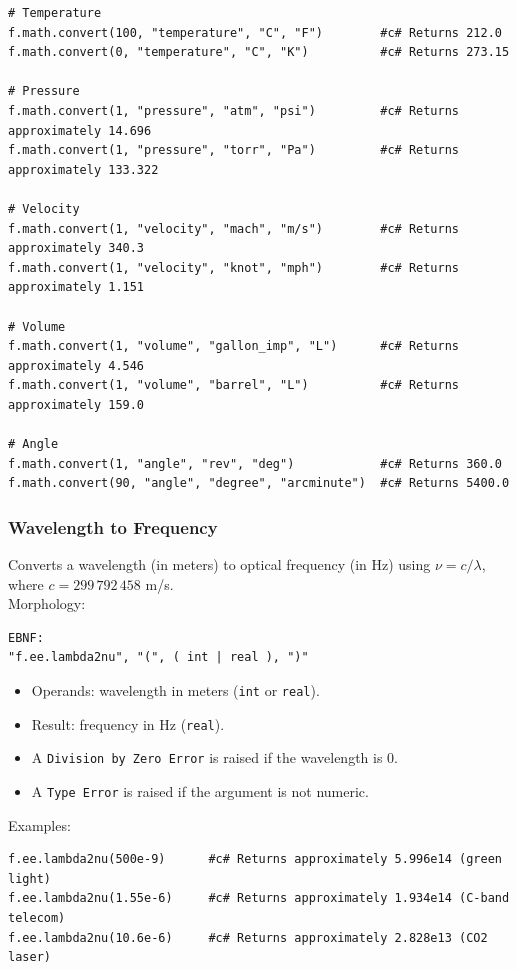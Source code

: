 \begin{verbatim}
# Temperature
f.math.convert(100, "temperature", "C", "F")        #c# Returns 212.0
f.math.convert(0, "temperature", "C", "K")          #c# Returns 273.15

# Pressure
f.math.convert(1, "pressure", "atm", "psi")         #c# Returns approximately 14.696
f.math.convert(1, "pressure", "torr", "Pa")         #c# Returns approximately 133.322

# Velocity
f.math.convert(1, "velocity", "mach", "m/s")        #c# Returns approximately 340.3
f.math.convert(1, "velocity", "knot", "mph")        #c# Returns approximately 1.151

# Volume
f.math.convert(1, "volume", "gallon_imp", "L")      #c# Returns approximately 4.546
f.math.convert(1, "volume", "barrel", "L")          #c# Returns approximately 159.0

# Angle
f.math.convert(1, "angle", "rev", "deg")            #c# Returns 360.0
f.math.convert(90, "angle", "degree", "arcminute")  #c# Returns 5400.0
\end{verbatim}

\subsubsection{Wavelength to Frequency}
Converts a wavelength (in meters) to optical frequency (in Hz) using $\nu = c / \lambda$, where $c = 299\,792\,458$ m/s. \\
Morphology:
\begin{verbatim}
EBNF:
"f.ee.lambda2nu", "(", ( int | real ), ")"
\end{verbatim}
\begin{itemize}
\item Operands: wavelength in meters (\texttt{int} or \texttt{real}).
\item Result: frequency in Hz (\texttt{real}).
\item A \texttt{Division by Zero Error} is raised if the wavelength is $0$.
\item A \texttt{Type Error} is raised if the argument is not numeric.
\end{itemize}
Examples:
\begin{verbatim}
f.ee.lambda2nu(500e-9)      #c# Returns approximately 5.996e14 (green light)
f.ee.lambda2nu(1.55e-6)     #c# Returns approximately 1.934e14 (C-band telecom)
f.ee.lambda2nu(10.6e-6)     #c# Returns approximately 2.828e13 (CO2 laser)
\end{verbatim}


